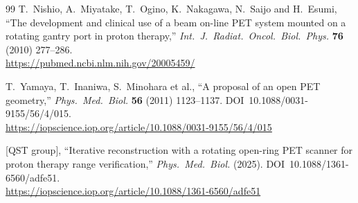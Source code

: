 \documentclass[11pt]{article}
\begin{document}
\begin{thebibliography}{99}
T.~Nishio, A.~Miyatake, T.~Ogino, K.~Nakagawa, N.~Saijo and H.~Esumi,
``The development and clinical use of a beam on-line PET system mounted on a
rotating gantry port in proton therapy,''
\textit{Int.\ J.\ Radiat.\ Oncol.\ Biol.\ Phys.} \textbf{76} (2010) 277--286.\\
\url{https://pubmed.ncbi.nlm.nih.gov/20005459/}

T.~Yamaya, T.~Inaniwa, S.~Minohara et al.,
``A proposal of an open PET geometry,''
\textit{Phys.\ Med.\ Biol.} \textbf{56} (2011) 1123--1137.
DOI~10.1088/0031-9155/56/4/015.\\
\url{https://iopscience.iop.org/article/10.1088/0031-9155/56/4/015}

[QST group],
``Iterative reconstruction with a rotating open-ring PET scanner for proton
therapy range verification,''
\textit{Phys.\ Med.\ Biol.} (2025). DOI~10.1088/1361-6560/adfe51.\\
\url{https://iopscience.iop.org/article/10.1088/1361-6560/adfe51}

\end{thebibliography}
\end{document}
